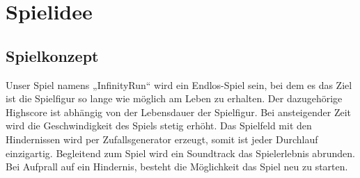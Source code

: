 \section{Spielidee}
\subsection{Spielkonzept}
Unser Spiel namens „InfinityRun“ wird ein Endlos-Spiel sein, bei dem es das Ziel ist die Spielfigur so lange wie möglich am Leben zu erhalten. Der dazugehörige Highscore ist abhängig von der Lebensdauer der Spielfigur. Bei ansteigender Zeit wird die Geschwindigkeit des Spiels stetig erhöht. Das Spielfeld mit den Hindernissen wird per Zufallsgenerator erzeugt, somit ist jeder Durchlauf einzigartig. Begleitend zum Spiel wird ein Soundtrack das Spielerlebnis abrunden. Bei Aufprall auf ein Hindernis, besteht die Möglichkeit das Spiel neu zu starten.
\newpage
